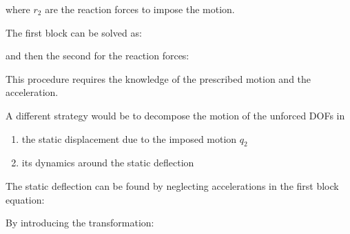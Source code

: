\documentclass[10pt,a4paper]{scrartcl}
\begin{document}
\begin{multicols*}{2}

where $r_2$ are the reaction forces to impose the motion.

The first block can be solved as:


and then the second for the reaction forces:


This procedure requires the knowledge of the prescribed motion and the acceleration.

A different strategy would be to decompose the motion of the unforced DOFs in

\begin{enumerate}
\item the static displacement due to the imposed motion $q_2$
\item its dynamics around the static deflection
\end{enumerate}


The static deflection can be found by neglecting accelerations in the first block equation:


By introducing the transformation:



\end{multicols*}
\end{document}
